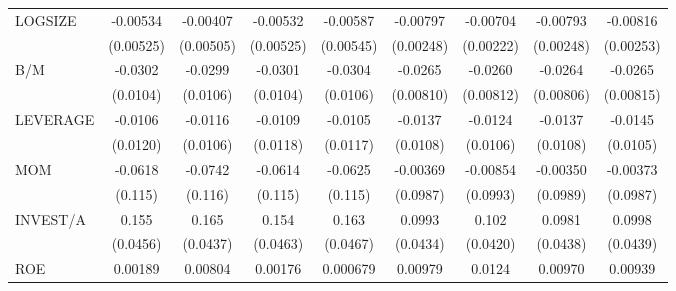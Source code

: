\begin{table}[htbp]
\begin{tabular}{l*{8}{c}}
LOGSIZE             &    -0.00534         &    -0.00407         &    -0.00532         &    -0.00587         &    -0.00797\sym{***}&    -0.00704\sym{***}&    -0.00793\sym{***}&    -0.00816\sym{***}\\
                    &   (0.00525)         &   (0.00505)         &   (0.00525)         &   (0.00545)         &   (0.00248)         &   (0.00222)         &   (0.00248)         &   (0.00253)         \\
B/M                 &     -0.0302\sym{***}&     -0.0299\sym{***}&     -0.0301\sym{***}&     -0.0304\sym{***}&     -0.0265\sym{***}&     -0.0260\sym{***}&     -0.0264\sym{***}&     -0.0265\sym{***}\\
                    &    (0.0104)         &    (0.0106)         &    (0.0104)         &    (0.0106)         &   (0.00810)         &   (0.00812)         &   (0.00806)         &   (0.00815)         \\
LEVERAGE            &     -0.0106         &     -0.0116         &     -0.0109         &     -0.0105         &     -0.0137         &     -0.0124         &     -0.0137         &     -0.0145         \\
                    &    (0.0120)         &    (0.0106)         &    (0.0118)         &    (0.0117)         &    (0.0108)         &    (0.0106)         &    (0.0108)         &    (0.0105)         \\
MOM                 &     -0.0618         &     -0.0742         &     -0.0614         &     -0.0625         &    -0.00369         &    -0.00854         &    -0.00350         &    -0.00373         \\
                    &     (0.115)         &     (0.116)         &     (0.115)         &     (0.115)         &    (0.0987)         &    (0.0993)         &    (0.0989)         &    (0.0987)         \\
INVEST/A            &       0.155\sym{***}&       0.165\sym{***}&       0.154\sym{***}&       0.163\sym{***}&      0.0993\sym{**} &       0.102\sym{**} &      0.0981\sym{**} &      0.0998\sym{**} \\
                    &    (0.0456)         &    (0.0437)         &    (0.0463)         &    (0.0467)         &    (0.0434)         &    (0.0420)         &    (0.0438)         &    (0.0439)         \\
ROE                 &     0.00189         &     0.00804         &     0.00176         &    0.000679         &     0.00979         &      0.0124         &     0.00970         &     0.00939         \\

\end{tabular}
\end{table}

